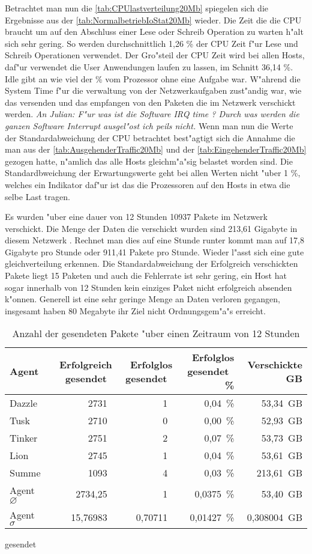 Betrachtet man nun die \cref{tab:CPUlastverteilung20Mb} spiegelen sich die Ergebnisse aus der \cref{tab:NormalbetriebIoStat20Mb} wieder. %
Die Zeit die die CPU braucht um auf den Abschluss einer Lese oder Schreib Operation zu warten h"alt sich sehr gering. %
So werden durchschnittlich 1,26 \% der CPU Zeit f"ur Lese und Schreib Operationen verwendet. Der Gro"steil der CPU Zeit wird %
bei allen Hosts, daf"ur verwendet die User Anwendungen laufen zu lassen, im Schnitt 36,14 \%. Idle gibt an wie viel der \% vom Prozessor %
ohne eine Aufgabe war. W"ahrend die System Time f"ur die verwaltung von der Netzwerkaufgaben zust"andig war, wie das versenden und das empfangen von %
den Paketen die im Netzwerk verschickt werden. \emph{An Julian: F"ur was ist die Software IRQ time ? Durch was werden die ganzen Software Interrupt %
ausgel"ost ich peils nicht.}%
Wenn man nun die Werte der Standardabweichung der CPU betrachtet best"agtigt sich die Annahme die man aus der %
\cref{tab:AusgehenderTraffic20Mb} und der \cref{tab:EingehenderTraffic20Mb} gezogen hatte, n"amlich das alle Hosts gleichm"a"sig belastet worden sind. %
Die Standardbweichung der Erwartungswerte geht bei allen Werten nicht "uber 1 \%, welches ein Indikator daf"ur ist das die %
Prozessoren auf den Hosts in etwa die selbe Last tragen.  

Es wurden "uber eine dauer von 12 Stunden 10937 Pakete im Netzwerk verschickt. Die Menge der Daten die verschickt wurden sind 213,61 Gigabyte in diesem Netzwerk . %
Rechnet man dies auf eine Stunde runter kommt man auf 17,8 Gigabyte pro Stunde oder 911,41 Pakete pro Stunde. Wieder l"asst sich eine gute gleichverteilung erkennen. %
Die Standardabweichung der Erfolgreich verschickten Pakete liegt 15 Paketen und auch die Fehlerrate ist sehr gering, ein Host %
hat sogar innerhalb von 12 Stunden kein einziges Paket nicht erfolgreich absenden k"onnen. Generell ist eine sehr geringe Menge an Daten verloren %
gegangen, insgesamt haben 80 Megabyte ihr Ziel nicht Ordnungsgem"a"s erreicht. %
\begin{table}
\centering
\begin{tabular}{l%
 r<{\,}%
 r<{\,}%
 r<{\,\%}%
 r<{\,GB}%
}
Agent  				& Erfolgreich gesendet			& Erfolglos gesendet			& Erfolglos gesendet	& Verschickte	\\
\hline
Dazzle 				& 2731			 		& 1					& 0,04			& 53,34			\\
Tusk 				& 2710					& 0					& 0,00			& 52,93			\\
Tinker				& 2751					& 2					& 0,07			& 53,73			\\
Lion				& 2745					& 1					& 0,04			& 53,61			\\ 
Summe				& 1093					& 4					& 0,03 			& 213,61		\\
Agent $\diameter $  		& 2734,25				& 1				 	& 0,0375		& 53,40 		\\   
Agent $\sigma $			& 15,76983	 			& 0,70711				& 0,01427      		& 0,308004		\\
\end{tabular}
gesendet\caption{Anzahl der gesendeten Pakete "uber einen Zeitraum von 12 Stunden}
\label{tab:VerschickteDaten20Mb}
\end{table}



